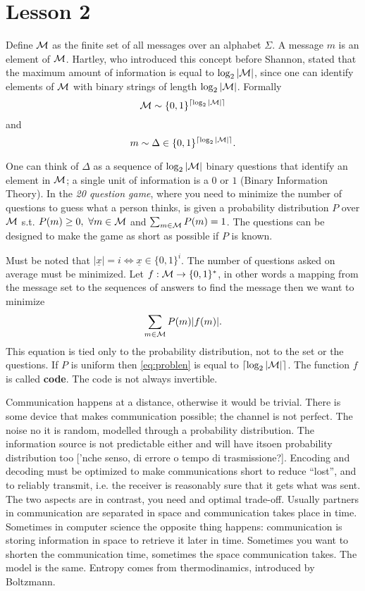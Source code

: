 
\section{Lesson 2}
Define $\mathcal{M}$ as the finite set of all messages over an alphabet $\Sigma$. A message $m$ is an element of $\mathcal{M}$. Hartley, who introduced this concept before Shannon, stated that the maximum amount of information is equal to $\log_2 |\mathcal{M}|$, since one can identify elements of $\mathcal{M}$ with binary strings of length $\log_2 |\mathcal{M}|$. Formally $$\mathcal{M} \sim \{0, 1\}^{\left\lceil\log_2 |\mathcal{M}|\right\rceil} $$ and $$ m \sim \Delta \in \{0, 1\}^{\left\lceil\log_2 |\mathcal{M}|\right\rceil}.$$

One can think of $\Delta$ as a sequence of $\log_2 |\mathcal{M}|$ binary questions that identify an element in $\mathcal{M}$; a single unit of information is a $0$ or $1$ (Binary Information Theory). In the \emph{20 question game}, where you need to minimize the number of questions to guess what a person thinks, is given a probability distribution $P$ over $\mathcal{M}$ s.t. $P(m) \geq 0,\ \forall m \in \mathcal{M}$ and $\sum_{m \in \mathcal{M}} P(m) = 1$. The questions can be designed to make the game as short as possible if $P$ is known.

Must be noted that $|\underline{x}| = i \Leftrightarrow \underline{x} \in \{0, 1\}^{i}$. The number of questions asked on average must be minimized. Let $f: \mathcal{M} \rightarrow \{0, 1\}^*$, in other words a mapping from the message set to the sequences of answers to find the message then we want to minimize 
\begin{equation} \label{eq:problen}
\sum_{m \in \mathcal{M}} P(m) |f(m)|.
\end{equation} 
This equation is tied only to the probability distribution, not to the set or the questions. If $P$ is uniform then \ref{eq:problen} is equal to $\left\lceil\log_2 |\mathcal{M}|\right\rceil$. The function $f$ is called \textbf{code}. The code is not always invertible.

Communication happens at a distance, otherwise it would be trivial. There is some device that makes communication possible; the channel is not perfect. The noise no it is random, modelled through a probability distribution. The information source is not predictable either and will have itsoen probability distribution too ['nche senso, di errore o tempo di trasmissione?]. Encoding and decoding must be optimized to make communications short to reduce ``lost'', and to reliably transmit, i.e. the receiver is reasonably sure that it gets what was sent. The two aspects are in contrast, you need and optimal trade-off. Usually partners in communication are separated in space and communication takes place in time. Sometimes in computer science the opposite thing happens: communication is storing information in space to retrieve it later in time. Sometimes you want to shorten the communication time, sometimes the space communication takes. The model is the same. Entropy comes from thermodinamics, introduced by Boltzmann.